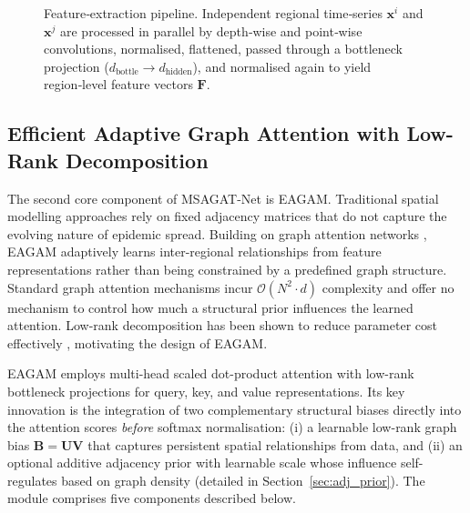 \documentclass[a4paper,fleqn]{cas-dc}
\begin{document}
\begin{figure}
{%
}
\caption{Feature‑extraction pipeline. Independent regional time‑series $\mathbf{x}^i$ and $\mathbf{x}^j$ are processed in parallel by depth‑wise and point‑wise convolutions, normalised, flattened, passed through a bottleneck projection ($d_{\text{bottle}}\!\to\! d_{\text{hidden}}$), and normalised again to yield region‑level feature vectors $\mathbf F$.}
\label{fig:feature_extraction}
\end{figure}

\subsection{Efficient Adaptive Graph Attention with Low-Rank Decomposition}

The second core component of MSAGAT-Net is EAGAM. Traditional spatial modelling approaches rely on fixed adjacency matrices that do not capture the evolving nature of epidemic spread. Building on graph attention networks \cite{velickovic2017graph}, EAGAM adaptively learns inter-regional relationships from feature representations rather than being constrained by a predefined graph structure. Standard graph attention mechanisms incur $\mathcal{O}(N^2 \cdot d)$ complexity and offer no mechanism to control how much a structural prior influences the learned attention. Low-rank decomposition has been shown to reduce parameter cost effectively \cite{puny2020global, kong2023low, yang2023self}, motivating the design of EAGAM.

EAGAM employs multi-head scaled dot-product attention with low-rank bottleneck projections for query, key, and value representations. Its key innovation is the integration of two complementary structural biases directly into the attention scores \emph{before} softmax normalisation: (i) a learnable low-rank graph bias $\mathbf{B} = \mathbf{UV}$ that captures persistent spatial relationships from data, and (ii) an optional additive adjacency prior with learnable scale whose influence self-regulates based on graph density (detailed in Section~\ref{sec:adj_prior}). The module comprises five components described below.
\end{document}
